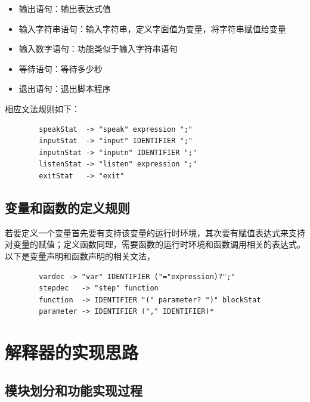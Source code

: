 \documentclass[12pt]{article}
\begin{document}
    \begin{itemize}
        \item 输出语句：输出表达式值
        \item 输入字符串语句：输入字符串，定义字面值为变量，将字符串赋值给变量
        \item 输入数字语句：功能类似于输入字符串语句
        \item 等待语句：等待多少秒
        \item 退出语句：退出脚本程序
    \end{itemize}

    相应文法规则如下：

    \begin{verbatim}
        speakStat  -> "speak" expression ";"
        inputStat  -> "input" IDENTIFIER ";"
        inputnStat -> "inputn" IDENTIFIER ";"
        listenStat -> "listen" expression ";"
        exitStat   -> "exit"
    \end{verbatim}

    \subsection{变量和函数的定义规则}\label{vars}

    若要定义一个变量首先要有支持该变量的运行时环境，其次要有赋值表达式来支持对变量的赋值；定义函数同理，需要函数的运行时环境和函数调用相关的表达式。以下是变量声明和函数声明的相关文法，

    \begin{verbatim}
        vardec -> "var" IDENTIFIER ("="expression)?";"
        stepdec   -> "step" function
        function  -> IDENTIFIER "(" parameter? ")" blockStat
        parameter -> IDENTIFIER ("," IDENTIFIER)*
    \end{verbatim}
    
    \section{解释器的实现思路}

    \subsection{模块划分和功能实现过程}\label{mod}
\end{document}
